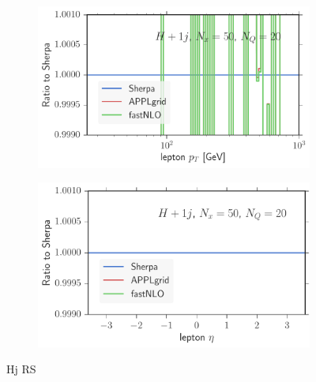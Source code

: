 \begin{figure}
\begin{subfigure}[]{0.49\textwidth}
	\includegraphics[width=\textwidth]{images/hjrs_lpt.pdf}
\end{subfigure}
\begin{subfigure}[]{0.49\textwidth}
	\includegraphics[width=\textwidth]{images/hjrs_leta.pdf}
\end{subfigure}
\caption{Hj RS}
\end{figure}
%
